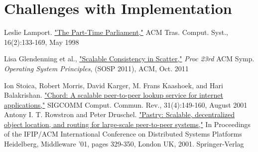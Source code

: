 \documentclass{amsart}
\theoremstyle{definition}
\theoremstyle{remark}
\numberwithin{equation}{section}
\begin{document}
\section{Challenges with Implementation}
\begin{thebibliography}{7}
Leslie Lamport. \href{http://research.microsoft.com/en-us/um/people/lamport/pubs/lamport-paxos.pdf}{"The Part-Time Parliament,"} ACM Tras. Comput. Syst., 16(2):133-169, May 1998

Lisa Glendenning et al.,  \href{http://homes.cs.washington.edu/~arvind/papers/scatter.pdf}{"Scalable Consistency in Scatter,"} \textit{Proc 23rd} ACM
Symp. \textit{Operating System Principles}, (SOSP 2011), ACM, Oct. 2011

Ion Stoica, Robert Morris, David Karger, M. Frans Kaashoek, and Hari Balakrishan. \href{http://pdos.csail.mit.edu/papers/chord:sigcomm01/chord_sigcomm.pdf}{"Chord: A scalable peer-to-peer lookup service for internet applications,"} 
SIGCOMM Comput. Commun. Rev., 31(4):149-160, August 2001
Antony I. T. Rowstron and Peter Druschel. \href{http://www.cs.unibo.it/~babaoglu/courses/cas12-13/resources/tutorials/pastry.pdf}{"Pastry: Scalable, decentralized object location, and routing for large-scale peer-to-peer systems,"} 
In Proceedings of the IFIP/ACM International Conference on Distributed Systems Platforms Heidelberg, Middleware '01, 
pages 329-350, London UK, 2001. Springer-Verlag


\end{thebibliography}
\end{document}
